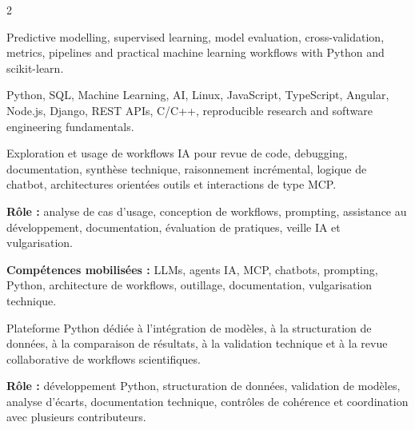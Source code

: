 \documentclass[8pt,a4paper,ragged2e,withhyper]{altacv}
\begin{document}
\begin{paracol}{2}


\small{
Predictive modelling, supervised learning, model evaluation, cross-validation, metrics, pipelines and practical machine learning workflows with Python and scikit-learn.
}

\divider


\divider


\small{
Python, SQL, Machine Learning, AI, Linux, JavaScript, TypeScript, Angular, Node.js, Django, REST APIs, C/C++, reproducible research and software engineering fundamentals.
}

\end{paracol}



Exploration et usage de workflows IA pour revue de code, debugging, documentation, synthèse technique, raisonnement incrémental, logique de chatbot, architectures orientées outils et interactions de type MCP.

\textbf{Rôle :} analyse de cas d’usage, conception de workflows, prompting, assistance au développement, documentation, évaluation de pratiques, veille IA et vulgarisation.

\textbf{Compétences mobilisées :} LLMs, agents IA, MCP, chatbots, prompting, Python, architecture de workflows, outillage, documentation, vulgarisation technique.

\divider


Plateforme Python dédiée à l’intégration de modèles, à la structuration de données, à la comparaison de résultats, à la validation technique et à la revue collaborative de workflows scientifiques.

\textbf{Rôle :} développement Python, structuration de données, validation de modèles, analyse d’écarts, documentation technique, contrôles de cohérence et coordination avec plusieurs contributeurs.
\end{document}
